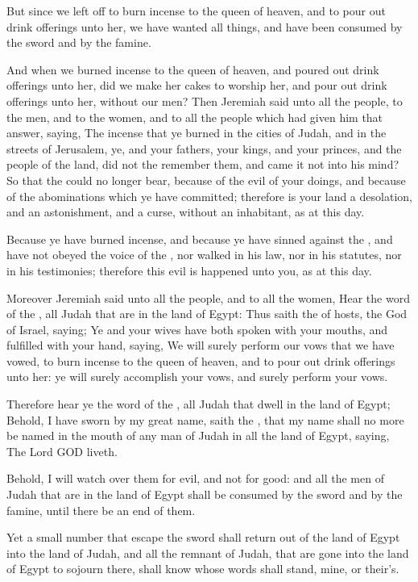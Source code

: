 \Verse But since we left off to burn incense to the queen of heaven, and to pour out drink offerings unto her, we have wanted all things, and have been consumed by the sword and by the famine.

\Verse And when we burned incense to the queen of heaven, and poured out drink offerings unto her, did we make her cakes to worship her, and pour out drink offerings unto her, without our men?  \Verse Then Jeremiah said unto all the people, to the men, and to the women, and to all the people which had given him that answer, saying, \Verse The incense that ye burned in the cities of Judah, and in the streets of Jerusalem, ye, and your fathers, your kings, and your princes, and the people of the land, did not the \LORD remember them, and came it not into his mind?  \Verse So that the \LORD could no longer bear, because of the evil of your doings, and because of the abominations which ye have committed; therefore is your land a desolation, and an astonishment, and a curse, without an inhabitant, as at this day.

\Verse Because ye have burned incense, and because ye have sinned against the \LORD, and have not obeyed the voice of the \LORD, nor walked in his law, nor in his statutes, nor in his testimonies; therefore this evil is happened unto you, as at this day.

\Verse Moreover Jeremiah said unto all the people, and to all the women, Hear the word of the \LORD, all Judah that are in the land of Egypt: \Verse Thus saith the \LORD of hosts, the God of Israel, saying; Ye and your wives have both spoken with your mouths, and fulfilled with your hand, saying, We will surely perform our vows that we have vowed, to burn incense to the queen of heaven, and to pour out drink offerings unto her: ye will surely accomplish your vows, and surely perform your vows.

\Verse Therefore hear ye the word of the \LORD, all Judah that dwell in the land of Egypt; Behold, I have sworn by my great name, saith the \LORD, that my name shall no more be named in the mouth of any man of Judah in all the land of Egypt, saying, The Lord GOD liveth.

\Verse Behold, I will watch over them for evil, and not for good: and all the men of Judah that are in the land of Egypt shall be consumed by the sword and by the famine, until there be an end of them.

\Verse Yet a small number that escape the sword shall return out of the land of Egypt into the land of Judah, and all the remnant of Judah, that are gone into the land of Egypt to sojourn there, shall know whose words shall stand, mine, or their's.

